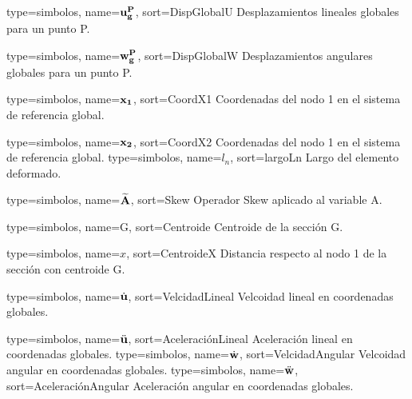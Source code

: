 {
	type={simbolos},
	name={$\bf{u}_g^P$}, %
	sort={DispGlobalU} %
}
{Desplazamientos lineales globales para un punto P.}

{
	type={simbolos},
	name={$\bf{w}_g^P$}, %
	sort={DispGlobalW} %
}
{Desplazamientos angulares globales para un punto P.}


{
	type={simbolos},
	name={$\bf{x}_1$}, %
	sort={CoordX1} %
}
{Coordenadas del nodo 1 en el sistema de referencia global.}

{
	type={simbolos},
	name={$\bf{x}_2$}, %
	sort={CoordX2} %
}
{Coordenadas del nodo 1 en el sistema de referencia global.}
{
	type={simbolos},
	name={$l_n$}, %
	sort={largoLn} %
}
{Largo del elemento deformado.}

{
	type={simbolos},
	name={$\widetilde{\bf{A}}$}, %
	sort={Skew} %
}
{Operador Skew aplicado al variable A.}

{
	type={simbolos},
	name={G}, %
	sort={Centroide} %
}
{Centroide de la sección G.}


{
	type={simbolos},
	name={$x$}, %
	sort={CentroideX} %
}
{Distancia respecto al nodo 1 de la sección con centroide G.}

{
	type={simbolos},
	name={$\dot{\bf{u}}$}, %
	sort={VelcidadLineal} %
}
{Velcoidad lineal en coordenadas globales.}

{
	type={simbolos},
	name={$\ddot{\bf{u}}$}, %
	sort={AceleraciónLineal} %
}
{Aceleración lineal en coordenadas globales.}
{
	type={simbolos},
	name={$\dot{\bf{w}}$}, %
	sort={VelcidadAngular} %
}
{Velcoidad angular en coordenadas globales.}
{
	type={simbolos},
	name={$\ddot{\bf{w}}$}, %
	sort={AceleraciónAngular} %
}
{Aceleración angular en coordenadas globales.}

